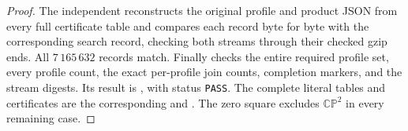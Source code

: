 \begin{proof}
The independent 
reconstructs the original profile and product JSON from every
full certificate table and compares each record byte for byte
with the corresponding search record, checking both streams
through their checked gzip ends. All $7\,165\,632$ records
match. Finally  checks the
entire required profile set, every profile count, the exact
per-profile join counts, completion markers, and the stream
digests. Its result is
, with status
\texttt{PASS}. The complete literal tables and certificates are
the corresponding  and
. The zero square excludes
$\mathbb{CP}^2$ in every remaining case.
\end{proof}

